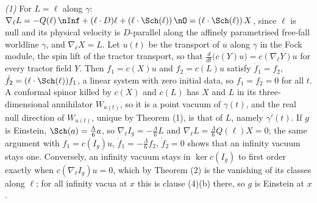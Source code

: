 \emph{(1)} For $L = \ell$ along $\gamma$: $\nabla_{\ell}L = -Q(\ell)\,\nInf + (\ell\cdot D)\ell + (\ell\cdot\Sch(\ell))\,\nO = (\ell\cdot\Sch(\ell))\,X$, since $\ell$ is null and its physical velocity is $D$-parallel along the affinely parametrised free-fall worldline $\gamma$, and $\nabla_{\ell}X = L$. Let $u(t)$ be the transport of $u$ along $\gamma$ in the Fock module, the spin lift of the tractor transport, so that $\frac{d}{dt}\big(c(Y)u\big) = c(\nabla_{\ell}Y)u$ for every tractor field $Y$. Then $f_{1} = c(X)u$ and $f_{2} = c(L)u$ satisfy $\dot f_{1} = f_{2}$, $\dot f_{2} = (\ell\cdot\Sch(\ell))f_{1}$, a linear system with zero initial data, so $f_{1} = f_{2} = 0$ for all $t$. A conformal spinor killed by $c(X)$ and $c(L)$ has $X$ and $L$ in its three-dimensional annihilator $W_{u(t)}$, so it is a point vacuum of $\gamma(t)$, and the real null direction of $W_{u(t)}$, unique by Theorem (1), is that of $L$, namely $\gamma'(t)$. If $g$ is Einstein, $\Sch(a) = \tfrac{\Lambda}{6}a$, so $\nabla_{\ell}I_{g} = -\tfrac{\Lambda}{6}L$ and $\nabla_{\ell}L = \tfrac{\Lambda}{6}Q(\ell)X = 0$; the same argument with $f_{1} = c(I_{g})u$, $\dot f_{1} = -\tfrac{\Lambda}{6}f_{2}$, $\dot f_{2} = 0$ shows that an infinity vacuum stays one. Conversely, an infinity vacuum stays in $\ker c(I_{g})$ to first order exactly when $c(\nabla_{\ell}I_{g})u = 0$, which by Theorem (2) is the vanishing of its classes along $\ell$; for all infinity vacua at $x$ this is clause (4)(b) there, so $g$ is Einstein at $x$.

